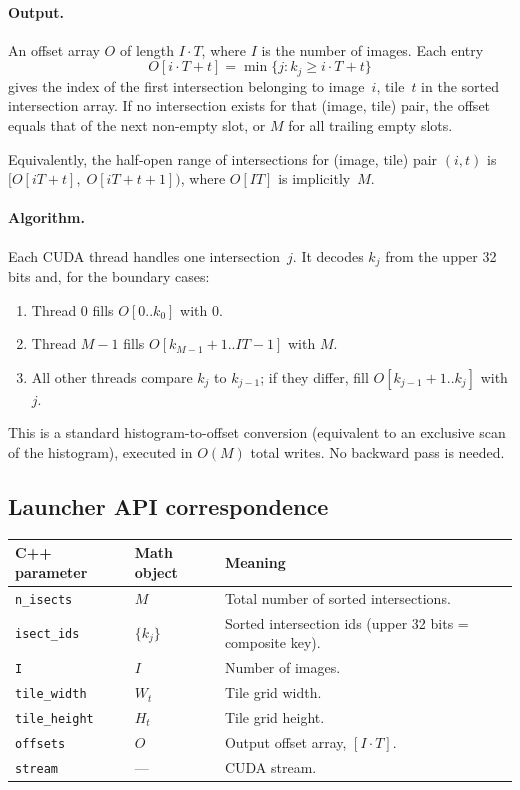 \documentclass[11pt]{article}
\begin{document}
\paragraph{Output.}
An offset array $O$ of length $I \cdot T$, where $I$ is the number of
images. Each entry
\[
  O[i \cdot T + t] = \min \{ j : k_j \ge i \cdot T + t \}
\]
gives the index of the first intersection belonging to image~$i$,
tile~$t$ in the sorted intersection array. If no intersection exists
for that (image, tile) pair, the offset equals that of the next
non-empty slot, or $M$ for all trailing empty slots.

Equivalently, the half-open range of intersections for (image, tile)
pair $(i,t)$ is $[O[i T + t],\; O[i T + t + 1])$, where $O[I T]$
is implicitly~$M$.

\paragraph{Algorithm.}
Each CUDA thread handles one intersection~$j$. It decodes $k_j$ from
the upper 32 bits and, for the boundary cases:
\begin{enumerate}
  \item Thread 0 fills $O[0..k_0]$ with 0.
  \item Thread $M{-}1$ fills $O[k_{M-1}{+}1 .. IT{-}1]$ with $M$.
  \item All other threads compare $k_j$ to $k_{j-1}$; if they differ,
  fill $O[k_{j-1}{+}1 .. k_j]$ with $j$.
\end{enumerate}
This is a standard histogram-to-offset conversion (equivalent to an
exclusive scan of the histogram), executed in $O(M)$ total writes.
No backward pass is needed.

\subsection{Launcher API correspondence}

\begin{center}
\begin{tabular}{l l p{7.5cm}}
\hline
\textbf{C++ parameter} & \textbf{Math object} & \textbf{Meaning} \\
\hline
\texttt{n\_isects} & $M$ & Total number of sorted intersections. \\
\texttt{isect\_ids} & $\{k_j\}$ & Sorted intersection ids (upper 32
bits = composite key). \\
\texttt{I} & $I$ & Number of images. \\
\texttt{tile\_width} & $W_t$ & Tile grid width. \\
\texttt{tile\_height} & $H_t$ & Tile grid height. \\
\texttt{offsets} & $O$ & Output offset array, $[I \cdot T]$. \\
\texttt{stream} & --- & CUDA stream. \\
\hline
\end{tabular}
\end{center}
\end{document}
